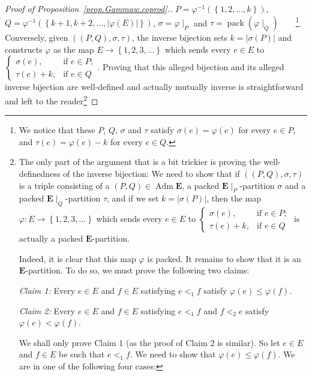 \documentclass[12pt]{article}
\theoremstyle{plain}
\theoremstyle{definition}
\theoremstyle{remark}
\newcommand{\Adm}{\operatorname{Adm}}
\newcommand{\pack}{\operatorname{pack}}
\newcommand{\EE}{{\mathbf{E}}}
\begin{document}
\begin{proof}[Proof of Proposition~\ref{prop.Gammaw.coprod}.]
$P = \varphi^{-1}\left(\left\{1, 2, \ldots, k\right\}\right)$,
\newline
$Q = \varphi^{-1}\left(\left\{k+1, k+2, \ldots, \left|\varphi\left(E\right)\right|\right\}\right)$,
$\sigma = \varphi\mid_P$ and
$\tau = \pack \left(\varphi\mid_Q\right)$\ \ \ \ \footnote{We
notice that these $P$, $Q$, $\sigma$ and $\tau$ satisfy
$\sigma\left(e\right) = \varphi\left(e\right)$ for every
$e \in P$, and $\tau\left(e\right) = \varphi\left(e\right) - k$
for every $e \in Q$.}. Conversely, given
$\left(\left(P, Q\right), \sigma, \tau\right)$,
the inverse bijection
sets $k = \left|\sigma\left(P\right)\right|$ and constructs
$\varphi$ as the map $E \to \left\{1, 2, 3, \ldots\right\}$
which sends every $e \in E$ to
$\begin{cases} \sigma\left(e\right), &\mbox{if } e \in P; \\
\tau\left(e\right) + k, &\mbox{if } e \in Q \end{cases}$.
Proving that this alleged bijection and its alleged inverse
bijection are well-defined and actually mutually inverse is
straightforward and left to the reader\footnote{The only
part of the argument that is a bit trickier is proving the
well-definedness of the inverse bijection: We need to show
that if $\left(\left(P, Q\right), \sigma, \tau
\right)$ is a triple consisting of a
$\left(P, Q\right) \in \Adm \EE$, a packed
$\EE\mid_P$-partition $\sigma$ and a packed $\EE\mid_Q$-partition
$\tau$, and if we set $k = \left|\sigma\left(P\right)\right|$,
then the map $\varphi : E \to \left\{1, 2, 3, \ldots\right\}$
which sends every $e \in E$ to
$\begin{cases} \sigma\left(e\right), &\mbox{if } e \in P; \\
\tau\left(e\right) + k, &\mbox{if } e \in Q \end{cases}$
is actually a packed $\EE$-partition.

Indeed, it is clear that this map $\varphi$ is packed. It remains
to show that it is an $\EE$-partition. To do so, we must prove
the following two claims:

\textit{Claim 1:} Every $e \in E$ and $f \in E$ satisfying
$e <_1 f$ satisfy
$\varphi\left(e\right) \leq \varphi\left(f\right)$.

\textit{Claim 2:} Every $e \in E$ and $f \in E$ satisfying
$e <_1 f$ and $f <_2 e$ satisfy
$\varphi\left(e\right) < \varphi\left(f\right)$.

We shall only prove Claim 1 (as the proof of Claim 2 is
similar). So let $e \in E$ and $f \in E$ be such that
$e <_1 f$. We need to show that
$\varphi\left(e\right) \leq \varphi\left(f\right)$.
We are in one of the following four cases:

}
\end{proof}
\end{document}
